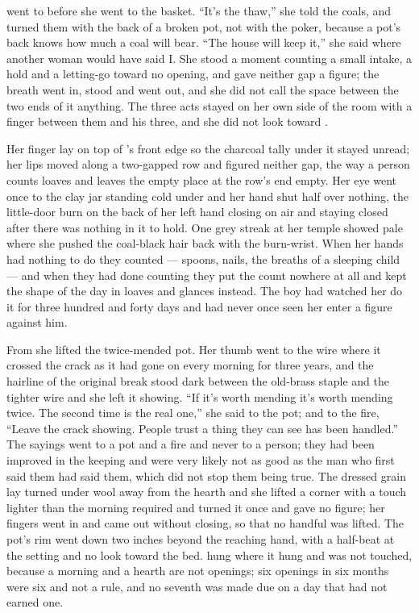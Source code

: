  went to  before she went to the basket. “It's the thaw,” she told the coals, and turned them with the back of a broken pot, not with the poker, because a pot's back knows how much a coal will bear. “The house will keep it,” she said where another woman would have said I. She stood a moment counting a small intake, a hold and a letting-go toward no opening, and gave neither gap a figure; the breath went in, stood and went out, and she did not call the space between the two ends of it anything. The three acts stayed on her own side of the room with a finger between them and his three, and she did not look toward .

Her finger lay on top of 's front edge so the charcoal tally under it stayed unread; her lips moved along a two-gapped row and figured neither gap, the way a person counts loaves and leaves the empty place at the row's end empty. Her eye went once to the clay jar standing cold under  and her hand shut half over nothing, the little-door burn on the back of her left hand closing on air and staying closed after there was nothing in it to hold. One grey streak at her temple showed pale where she pushed the coal-black hair back with the burn-wrist. When her hands had nothing to do they counted --- spoons, nails, the breaths of a sleeping child --- and when they had done counting they put the count nowhere at all and kept the shape of the day in loaves and glances instead. The boy had watched her do it for three hundred and forty days and had never once seen her enter a figure against him.

From  she lifted the twice-mended pot. Her thumb went to the wire where it crossed the crack as it had gone on every morning for three years, and the hairline of the original break stood dark between the old-brass staple and the tighter wire and she left it showing. “If it's worth mending it's worth mending twice. The second time is the real one,” she said to the pot; and to the fire, “Leave the crack showing. People trust a thing they can see has been handled.” The sayings went to a pot and a fire and never to a person; they had been improved in the keeping and were very likely not as good as the man who first said them had said them, which did not stop them being true. The dressed grain lay turned under wool away from the hearth and she lifted a corner with a touch lighter than the morning required and turned it once and gave no figure; her fingers went in and came out without closing, so that no handful was lifted. The pot's rim went down two inches beyond the reaching hand, with a half-beat at the setting and no look toward the bed.  hung where it hung and was not touched, because a morning and a hearth are not openings; six openings in six months were six and not a rule, and no seventh was made due on a day that had not earned one.

